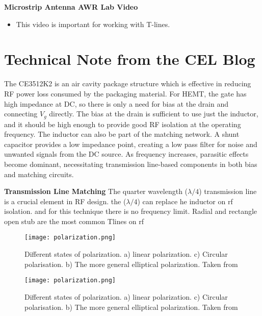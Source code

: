 \documentclass[english]{article}
\begin{document}
\textbf{Microstrip Antenna AWR Lab Video}
\begin{itemize} 
    \item This video is important for working with T-lines.
\end{itemize}

\section{Technical Note from the CEL Blog}
The CE3512K2 is an air cavity package structure which is effective in reducing RF power loss consumed by the packaging material. For HEMT, the gate has high impedance at DC, so there is only a need for bias at the drain and connecting \( V_g \) directly. The bias at the drain is sufficient to use just the inductor, and it should be high enough to provide good RF isolation at the operating frequency. The inductor can also be part of the matching network. A shunt capacitor provides a low impedance point, creating a low pass filter for noise and unwanted signals from the DC source. As frequency increases, parasitic effects become dominant, necessitating transmission line-based components in both bias and matching circuits.

\textbf{Transmission Line Matching}
The quarter wavelength (\( \lambda /4 \)) transmission line is a crucial element in RF design.
the (\(\lambda/4 \)) can replace he inductor on rf isolation. and for this technique there is no frequency limit.
Radial and rectangle open stub are the most common Tlines on rf 




















\begin{figure}[!h]
    \centering
    \texttt{[image: polarization.png]}
    \caption{Different states of polarization. a) linear polarization. c) Circular polarisation. b) The more general elliptical polarization. Taken from \cite{polarization} }
    \label{fig:Polarization}
\end{figure}

\begin{figure}[!h]
    \centering
    \texttt{[image: polarization.png]}
    \caption{Different states of polarization. a) linear polarization. c) Circular polarisation. b) The more general elliptical polarization. Taken from \cite{polarization} }
    \label{fig:Polarization}
\end{figure}
\end{document}
